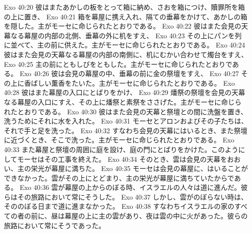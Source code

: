Exo 40:20  彼はまたあかしの板をとって箱に納め、さおを箱につけ、贖罪所を箱の上に置き、
Exo 40:21  箱を幕屋に携え入れ、隔ての垂幕をかけて、あかしの箱を隠した。主がモーセに命じられたとおりである。
Exo 40:22  彼はまた会見の天幕なる幕屋の内部の北側、垂幕の外に机をすえ、
Exo 40:23  その上にパンを列に並べて、主の前に供えた。主がモーセに命じられたとおりである。
Exo 40:24  彼はまた会見の天幕なる幕屋の内部の南側に、机にむかい合わせて燭台をすえ、
Exo 40:25  主の前にともしびをともした。主がモーセに命じられたとおりである。
Exo 40:26  彼は会見の幕屋の中、垂幕の前に金の祭壇をすえ、
Exo 40:27  その上に香ばしい薫香をたいた。主がモーセに命じられたとおりである。
Exo 40:28  彼はまた幕屋の入口にとばりをかけ、
Exo 40:29  燔祭の祭壇を会見の天幕なる幕屋の入口にすえ、その上に燔祭と素祭をささげた。主がモーセに命じられたとおりである。
Exo 40:30  彼はまた会見の天幕と祭壇との間に洗盤を置き、洗うためにそれに水を入れた。
Exo 40:31  モーセとアロンおよびその子たちは、それで手と足を洗った。
Exo 40:32  すなわち会見の天幕にはいるとき、また祭壇に近づくとき、そこで洗った。主がモーセに命じられたとおりである。
Exo 40:33  また幕屋と祭壇の周囲に庭を設け、庭の門にとばりをかけた。このようにしてモーセはその工事を終えた。
Exo 40:34  そのとき、雲は会見の天幕をおおい、主の栄光が幕屋に満ちた。
Exo 40:35  モーセは会見の幕屋に、はいることができなかった。雲がその上にとどまり、主の栄光が幕屋に満ちていたからである。
Exo 40:36  雲が幕屋の上からのぼる時、イスラエルの人々は道に進んだ。彼らはその旅路において常にそうした。
Exo 40:37  しかし、雲がのぼらない時は、そののぼる日まで道に進まなかった。
Exo 40:38  すなわちイスラエルの家のすべての者の前に、昼は幕屋の上に主の雲があり、夜は雲の中に火があった。彼らの旅路において常にそうであった。


